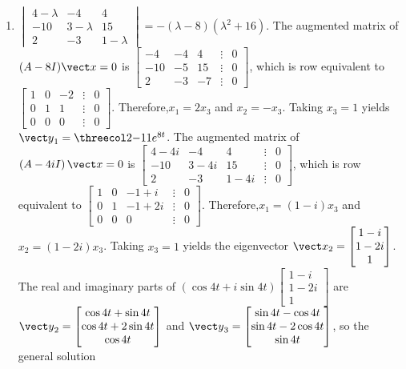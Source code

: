 \documentclass[openany]{book}
\newenvironment{sectionSolutions}{
 \begin{enumerate}[item-label={\thesection.\arabic{enumi}.}]
}{
 \end{enumerate}
}
\begin{document}
\begin{sectionSolutions}
\item
$\begin{vmatrix}4-\lambda&-4&4\\-10&3-\lambda&15\\2
&-3&1-\lambda\end{vmatrix}=-(\lambda-8)(\lambda^2+16)$.
 The augmented matrix of $(A-8I){\vect x=0}$ is
$\begin{bmatrix}-4&-4&4&\vdots&0\\-10&-5&15&\vdots&0\\
2&-3&-7&\vdots&0\end{bmatrix}$,
which is row equivalent to
$\begin{bmatrix} 1&0&-2&\vdots&0\\ 0&1&1&
\vdots&0\\ 0&0&0&\vdots&0\end{bmatrix}$.
Therefore,$x_1=2x_3$ and $x_2=-x_3$. Taking $x_3=1$ yields
${\vect y}_1=\threecol2{-1}1e^{8t}$.
The augmented matrix of
$\left(A-4iI\right){\vect x=0}$ is
$\begin{bmatrix}4-4i&-4&4&\vdots&0\\-10&3-4i&15&\vdots&0\\
2&-3&1-4i&\vdots&0\end{bmatrix}$,
which is row equivalent to
$\begin{bmatrix} 1&0&-1+i&\vdots&0\\
0&1&-1+2i&\vdots&0\\ 0&0&0&\vdots&0\end{bmatrix}$.
Therefore,$x_1=(1-i)x_3$ and $x_2=(1-2i)x_3$.
Taking $x_3=1$ yields the eigenvector
${\vect x}_2=\begin{bmatrix}1-i\\1-2i\\1\end{bmatrix}$.
The real and imaginary parts of
$(\cos4t+i\sin
4t)\begin{bmatrix}1-i\\1-2i\\1\end{bmatrix}$
are ${\vect y}_2=\begin{bmatrix}\cos4t+\sin4t
\\\cos4t+2\sin4t\\\cos4t\end{bmatrix}$ and
${\vect y}_3=\begin{bmatrix}\sin4t-\cos4t
\\\sin4t-2\cos4t\\\sin4t\end{bmatrix}$, so the general solution

\end{sectionSolutions}
\end{document}
